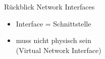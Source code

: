 \documentclass[ngerman,aspectratio=169]{beamer}
\begin{document}
	\begin{frame}{Rückblick Network Interfaces}
		\begin{multicols}{2}
			\begin{itemize}
				\setlength{\itemsep}{1em}
				\item Interface = Schnittstelle
				\item muss nicht physisch sein\\(Virtual Network Interface)
			\end{itemize}
		\end{multicols}
	\end{frame}
\end{document}
